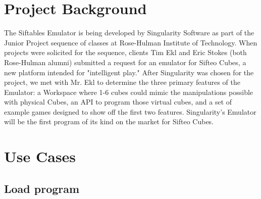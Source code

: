 \documentclass[12pt]{article}
\begin{document}
\section{Project Background}
The Siftables Emulator is being developed by Singularity Software as part of the Junior Project sequence of classes at Rose-Hulman Institute of Technology. When projects were solicited for the sequence, clients Tim Ekl and Eric Stokes (both Rose-Hulman alumni) submitted a request for an emulator for Sifteo Cubes, a new platform intended for "intelligent play." After Singularity was chosen for the project, we met with Mr. Ekl to determine the three primary features of the Emulator: a Workspace where 1-6 cubes could mimic the manipulations possible with physical Cubes, an \gls{API} to program those virtual cubes, and a set of example games designed to show off the first two features. Singularity's Emulator will be the first program of its kind on the market for Sifteo Cubes.

\clearpage

\section{Use Cases}

  \subsection{Load program}
\end{document}
